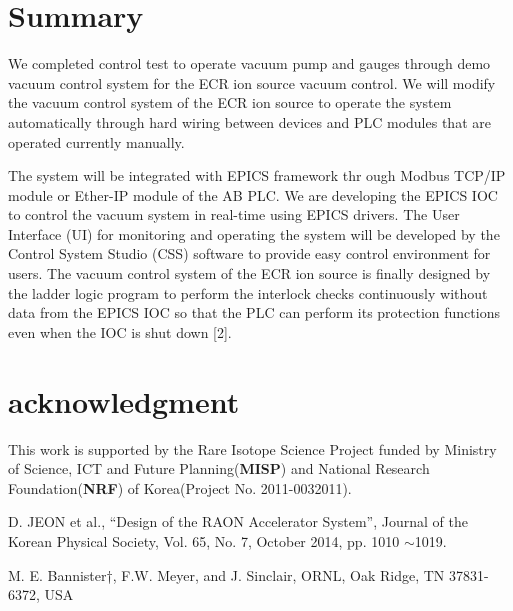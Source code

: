\documentclass[a4paper,
              ]{jacow}
\newcommand\SEC[1]{\textbf{\uppercase{#1}}}
\begin{document}
\section{Summary}
We completed control test to operate vacuum pump and gauges through demo vacuum control system for the ECR ion source vacuum control. We will modify the vacuum control system of the ECR ion source to operate the system automatically through hard wiring between devices and PLC modules that are operated currently manually. %
%
\iftrue   %
\newpage
\raggedend
\fi
The system will be integrated with EPICS framework thr ough Modbus TCP/IP module or Ether-IP module of the AB PLC. We are developing the EPICS IOC to control the vacuum system in real-time using EPICS drivers. 
The User Interface (UI) for monitoring and operating the system will be developed by the Control System Studio (CSS) software to provide easy control environment for users.
The vacuum control system of the ECR ion source is finally designed by the ladder logic program to perform the interlock checks continuously without data from the EPICS IOC so that the PLC can perform its protection functions even when the IOC is  shut down [2].

\section{acknowledgment}
This work is supported by the Rare Isotope Science Project funded by Ministry of Science, ICT and Future Planning(\SEC{MISP}) and National Research Foundation(\SEC{NRF}) of Korea(Project No. 2011-0032011).

%
%
\iftrue   %
\raggedend
\fi

\begin{thebibliography}{99} %
 

	
	D. JEON et al., “Design of the RAON Accelerator System”, Journal of the Korean Physical Society, Vol. 65, No. 7, October 2014,  pp. 1010 $\sim$1019.

    M. E. Bannister†, F.W. Meyer, and J. Sinclair, ORNL, Oak Ridge, TN 37831-6372, USA



\end{thebibliography}
\end{document}
